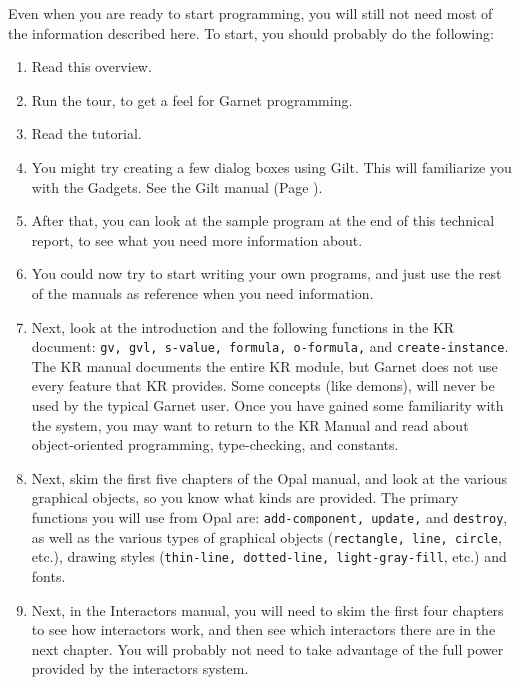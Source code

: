 \documentclass{report}
\begin{document}
Even when you are ready to start programming, you will still not need
most of the information described here.  To start, you should probably
do the following:
\begin{enumerate}
\item Read this overview.
  
\item Run the tour, to get a feel for Garnet programming.
  
\item Read the tutorial.
  
\item You might try creating a few dialog boxes using Gilt.  This will
  familiarize you with the Gadgets.  See the Gilt manual (Page
  \pageref{gilt}).
  
\item After that, you can look at the sample program at the end of
  this technical report, to see what you need more information about.
  
\item You could now try to start writing your own programs, and just
  use the rest of the manuals as reference when you need information.
  
\item Next, look at the introduction and the following functions in
  the KR document: \texttt{gv, gvl, s-value, formula, o-formula,} and
  \texttt{create-instance}.  The KR manual documents the entire KR module,
  but Garnet does not use every feature that KR provides.  Some
  concepts (like demons), will never be used by the typical Garnet
  user.  Once you have gained some familiarity with the system, you
  may want to return to the KR Manual and read about object-oriented
  programming, type-checking, and constants.
  
\item Next, skim the first five chapters of the Opal manual, and look
  at the various graphical objects, so you know what kinds are
  provided.  The primary functions you will use from Opal are:
  \texttt{add-component, update,} and \texttt{destroy}, as well as the various
  types of graphical objects (\texttt{rectangle, line, circle}, etc.),
  drawing styles (\texttt{thin-line, dotted-line, light-gray-fill}, etc.)
  and fonts.
  
\item Next, in the Interactors manual, you will need to skim the first
  four chapters to see how interactors work, and then see which
  interactors there are in the next chapter.  You will probably not
  need to take advantage of the full power provided by the interactors
  system.
  

\end{enumerate}
\end{document}
